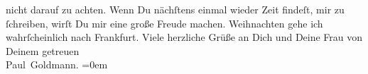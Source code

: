 \begin{ledgroupsized}[t]{13cm}
               nicht darauf zu achten.\pend
           \pstart
           Wenn Du nächſtens einmal wieder Zeit findeſt, mir zu ſchreiben, wirſt Du mir eine
               große Freude machen. Weihnachten gehe ich
               wahrſcheinlich nach {\pb}Frankfurt.\pend
           \pstart
           Viele herzliche Grüße an Dich und Deine Frau von Deinem getreuen {\\[\baselineskip]}\spacefill\mbox{Paul Goldmann.}\pend
           \leftskip=0em{}
         
         \endnumbering{}\end{ledgroupsized}  \newcommand{\dateiname}{L03389}\newcommand{\titel}{Paul Goldmann an Arthur Schnitzler, 13. 12. [1903]}\newcommand{\editorInnen}{Martin Anton Müller und Laura Untner}
      